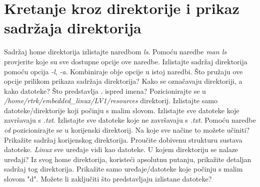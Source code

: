 \documentclass[11pt]{article}
\begin{document}
 \section{Kretanje kroz direktorije i prikaz sadržaja direktorija}
Sadržaj home direktorija izlistajte naredbom \textit{ls}. Pomoću naredbe
 \textit{man ls} provjerite koje su sve dostupne opcije ove naredbe. Izlistajte
 sadržaj direktorija pomoću opcija \textit{-l}, \textit{-a}. Kombiniraje obje
 opcije u istoj naredbi. Što pružaju ove opcije prilikom prikaza sadržaja
 direktorija? Kako se označavaju direktoriji, a kako datoteke? Što predstavlja
 . ispred imena?
\newline
\newline
Pozicionirajte se u \textit{/home/rtrk/embedded\_linux/LV1/resources}
 direktorij. Izlistajte samo datoteke/direktorije koji počinju s malim slovom.
 Izlistajte sve datoteke koje završavaju s \textit{.txt}. Izlistajte sve
 datoteke koje ne završavaju s \textit{.txt}.
\newline
\newline
Pomoću naredbe \textit{cd} pozicionirajte se u korijenski direktorij. Na koje
 sve načine to možete učiniti? Prikažite sadržaj korijenskog direktorija.
 Proučite dobivenu strukturu sustava datoteke.
\newline
\newline
\textit{Linux} sve uređaje vidi kao datoteke. U kojem direktoriju se nalaze
 uređaji? Iz svog home direktorija, koristeći apsolutnu putanju, prikažite
 detaljan sadržaj tog direktorija. Prikažite samo uređaje/datoteke koje počinju
 s malim slovom "d". Možete li zaključiti što predstavljaju izlistane datoteke?
\end{document}

